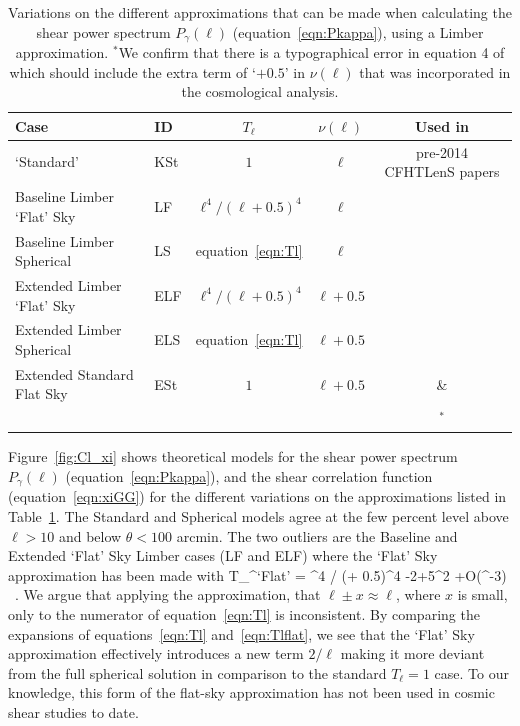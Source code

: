  \begin{table}[htb]
\begin{center}
\begin{tabular}{ | l | l | c | c  | c |}
\hline
Case & ID & $T_\ell$ & $\nu(\ell)$ & Used in \\ \hline
\citet{kitching/etal:2016} `Standard' & KSt & $1$ & $\ell$ & pre-2014 CFHTLenS papers \\
Baseline Limber `Flat' Sky &  LF & $\ell^4 / (\ell + 0.5)^4$ & $\ell$ & \\
Baseline Limber Spherical & LS & equation~\ref{eqn:Tl} & $\ell$ & \\
Extended Limber `Flat' Sky & ELF & $\ell^4 / (\ell + 0.5)^4$ & $\ell + 0.5$ & \\
Extended Limber Spherical & ELS & equation~\ref{eqn:Tl}& $\ell + 0.5$  & \\
Extended Standard Flat Sky & ESt & $1$ & $\ell + 0.5$ & \citet{joudaki/etal:2016} \&  \\
  &  & & & \citet{hildebrandt/etal:2016}$^*$\\\hline
 \end{tabular}
 \end{center}
 \caption{\label{tab:Tl_nu}Variations on the different approximations that can be made when calculating the shear power spectrum $P_\gamma(\ell)$ (equation~\ref{eqn:Pkappa}), using a Limber approximation.  $^*$We confirm that there is a typographical error in equation 4 of \citet{hildebrandt/etal:2016} which should include the extra term of `$+0.5$' in $\nu(\ell)$ that was incorporated in the cosmological analysis.} 
 \end{table}

Figure~\ref{fig:Cl_xi} shows theoretical models for the shear power spectrum $P_\gamma(\ell)$ (equation~\ref{eqn:Pkappa}), and the shear correlation function (equation~\ref{eqn:xiGG}) for the different variations on the approximations listed in Table~\ref{tab:Tl_nu}.   The Standard and Spherical models agree at the few percent level above $\ell>10$ and below $\theta< 100$ arcmin.  The two outliers are the Baseline and Extended `Flat' Sky Limber cases (LF and ELF) where the \citet{kitching/etal:2016} `Flat' Sky approximation has been made with
\be
T_\ell^{\rm `Flat'} = \ell^4 / (\ell + 0.5)^4 -{2\over \ell}+{5\ell^2} +{\cal O}(\ell^{-3}) \, . 
\ee    
We argue that applying the approximation, that $\ell \pm x \approx \ell$, where $x$ is small, only to the numerator of equation~\ref{eqn:Tl} is inconsistent.  By comparing the expansions of equations~\ref{eqn:Tl} and~\ref{eqn:Tlflat}, we see that the \citet{kitching/etal:2016} `Flat' Sky approximation effectively introduces a new term $2/\ell$ making it more deviant from the full spherical solution in comparison to the standard $T_\ell = 1$ case.    To our knowledge, this form of the flat-sky approximation has not been used in cosmic shear studies to date.  

